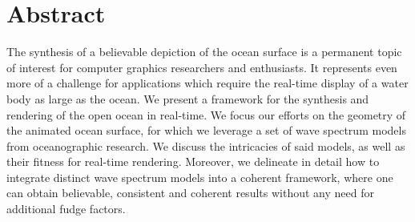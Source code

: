 \chapter*{Abstract}


The synthesis of a believable depiction of the ocean surface is a permanent
topic of interest for computer graphics researchers and enthusiasts. It
represents even more of a challenge for applications which require the
real-time display of a water body as large as the ocean.
We present a framework for the synthesis and rendering of the open ocean
in real-time. We focus our efforts on the geometry of the animated ocean
surface, for which we leverage a set of wave spectrum models from
oceanographic research. We discuss the intricacies of said models,
as well as their fitness for real-time rendering. Moreover, we delineate
in detail how to integrate distinct wave spectrum models into a
coherent framework, where one can obtain believable, consistent and
coherent results without any need for additional fudge factors.

